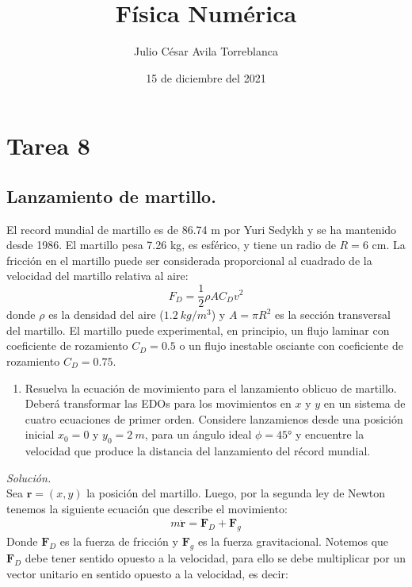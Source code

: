 \documentclass[11pt]{article}
\title{Física Numérica}
\author{Julio César Avila Torreblanca}
\date{15 de diciembre del 2021}
\begin{document}
	\maketitle
	
	\section*{Tarea 8}
	\subsection*{\textbf{Lanzamiento de martillo.}}
	El record mundial de martillo es de 86.74 m por Yuri Sedykh y se ha mantenido desde 1986. El martillo pesa 7.26 kg, es esférico, y tiene un radio de $R=6$ cm. La fricción en el martillo puede ser considerada proporcional al cuadrado de la velocidad del martillo relativa al aire:
	\begin{equation}
		F_D = \frac{1}{2} \rho A C_D v^2
	\end{equation}
	donde $\rho$ es la densidad del aire ($\SI{1.2}{kg/m^3}$) y $A=\pi R^2$ es la sección transversal del martillo. El martillo puede experimental, en principio, un flujo laminar con coeficiente de rozamiento $C_D=0.5$ o un flujo inestable osciante con coeficiente de rozamiento $C_D=0.75$.  
	\begin{enumerate}
		\item Resuelva la ecuación de movimiento para el lanzamiento oblicuo de martillo. Deberá transformar las EDOs para los movimientos en $x$ y $y$ en un sistema de cuatro ecuaciones de primer orden. Considere lanzamienos desde una posición inicial $x_0 = 0$ y $y_0 = \SI{2}{m}$, para un ángulo ideal $\phi = 45°$ y encuentre la velocidad que produce la distancia del lanzamiento del récord mundial.
	\end{enumerate}
\textit{Solución.}\\
	Sea $\bm{r} = (x,y)$ la posición del martillo. Luego, por la segunda ley de Newton tenemos la siguiente ecuación que describe el movimiento:
	\begin{eqnarray}
		m \bm{\ddot{r}} = \bm{F}_D + \bm{F}_g	\label{eq1}
	\end{eqnarray}
	Donde $\bm{F}_D$ es la fuerza de fricción y $\bm{F}_g$ es la fuerza gravitacional. Notemos que $\bm{F}_D$ debe tener sentido opuesto a la velocidad, para ello se debe multiplicar por un vector unitario en sentido opuesto a la velocidad, es decir:
\end{document}
